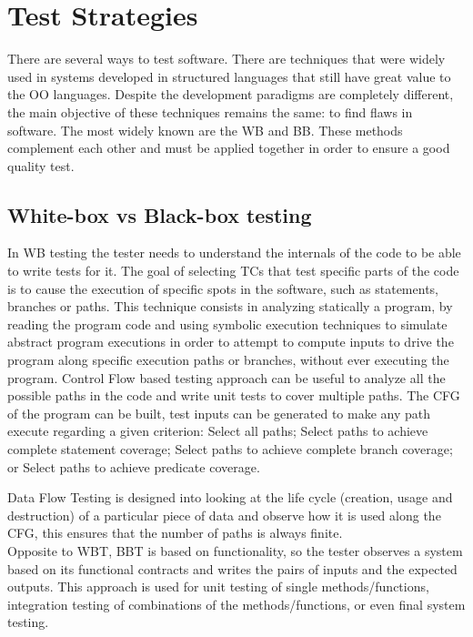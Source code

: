 {\section{Test Strategies}
There are several ways to test software. There are techniques that were widely used in systems developed in structured languages
that still have great value to the \ac{OO} languages. Despite the development paradigms are completely different,
the main objective of these techniques remains the same: to find flaws in software\cite{Myers:2004:AST:983238}.
The most widely known are the \ac{WB} and \ac{BB}.
These methods complement each other and must be applied together in order to ensure a good quality test.
\subsection{White-box vs Black-box testing}
}
In \ac{WB} testing the tester needs to understand the internals of
the code to be able to write tests for it.
The goal of selecting \ac{TC}s that test specific parts of the code
is to cause the execution of specific spots in the software, such as
statements, branches or paths.
This technique consists in analyzing statically a program, by reading
the program code and using symbolic execution techniques to simulate
abstract program
executions in order to attempt to compute inputs to drive the program
along specific execution paths or branches, without ever executing the
program. Control Flow based testing approach can be useful to analyze all the
possible paths in the code and write unit tests to cover multiple paths.
The \ac{CFG} of the program can be built,
test inputs can be generated to make any path execute regarding a given criterion:
Select all paths;
Select paths to achieve complete statement
coverage\cite{stt,Ntafos:1988:CST:630792.631017};
Select paths to achieve complete branch coverage\cite{Roper1994,stt};
or Select paths to achieve predicate
coverage\cite{stt,Ntafos:1988:CST:630792.631017}.

Data Flow Testing is designed into looking at the life cycle
(creation, usage and destruction) of a particular
piece of data and observe how it is used along the \ac{CFG}, this ensures
that the number of paths is always finite\cite{dataflow}.\\

Opposite to \ac{WBT}, \ac{BBT} is based on
functionality, so the tester observes a system based
on its functional contracts and writes the pairs of inputs and the
expected outputs.
This approach is used for unit testing of single methods/functions,
integration testing
of combinations of the methods/functions, or even final system testing.\\

